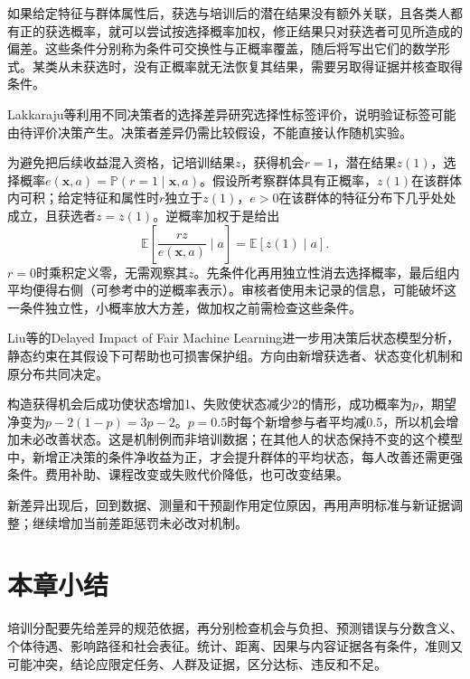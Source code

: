 如果给定特征与群体属性后，获选与培训后的潜在结果没有额外关联，且各类人都有正的获选概率，就可以尝试按选择概率加权，修正结果只对获选者可见所造成的偏差。这些条件分别称为条件可交换性与正概率覆盖，随后将写出它们的数学形式。某类从未获选时，没有正概率就无法恢复其结果，需要另取得证据并核查取得条件。

Lakkaraju等利用不同决策者的选择差异研究选择性标签评价，说明验证标签可能由待评价决策产生。决策者差异仍需比较假设，不能直接认作随机实验。

为避免把后续收益混入资格，记培训结果$z$，获得机会$r=1$，潜在结果$z(1)$，选择概率$e(\bm{x},a)=\mathbb P(r=1\mid\bm{x},a)$。假设所考察群体具有正概率，$z(1)$在该群体内可积；给定特征和属性时$r$独立于$z(1)$，$e>0$在该群体的特征分布下几乎处处成立，且获选者$z=z(1)$。逆概率加权于是给出
\begin{equation}
 \mathbb E\!\left[\frac{r z}{e(\bm{x},a)}\mid a\right]
 =\mathbb E[z(1)\mid a].
 \label{eq:fairness-selective-weight}
\end{equation}
$r=0$时乘积定义零，无需观察其$z$。先条件化再用独立性消去选择概率，最后组内平均便得右侧（可参考中的逆概率表示）。审核者使用未记录的信息，可能破坏这一条件独立性，小概率放大方差，做加权之前需检查这些条件。

Liu等的Delayed Impact of Fair Machine Learning进一步用决策后状态模型分析，静态约束在其假设下可帮助也可损害保护组。方向由新增获选者、状态变化机制和原分布共同决定。

构造获得机会后成功使状态增加1、失败使状态减少2的情形，成功概率为$p$，期望净变为$p-2(1-p)=3p-2$。$p=0.5$时每个新增参与者平均减0.5，所以机会增加未必改善状态。这是机制例而非培训数据；在其他人的状态保持不变的这个模型中，新增正决策的条件净收益为正，才会提升群体的平均状态，每人改善还需更强条件。费用补助、课程改变或失败代价降低，也可改变结果。

新差异出现后，回到数据、测量和干预副作用定位原因，再用声明标准与新证据调整；继续增加当前差距惩罚未必改对机制。

\section{本章小结}
\label{sec:fairness-summary}

培训分配要先给差异的规范依据，再分别检查机会与负担、预测错误与分数含义、个体待遇、影响路径和社会表征。统计、距离、因果与内容证据各有条件，准则又可能冲突，结论应限定任务、人群及证据，区分达标、违反和不足。

